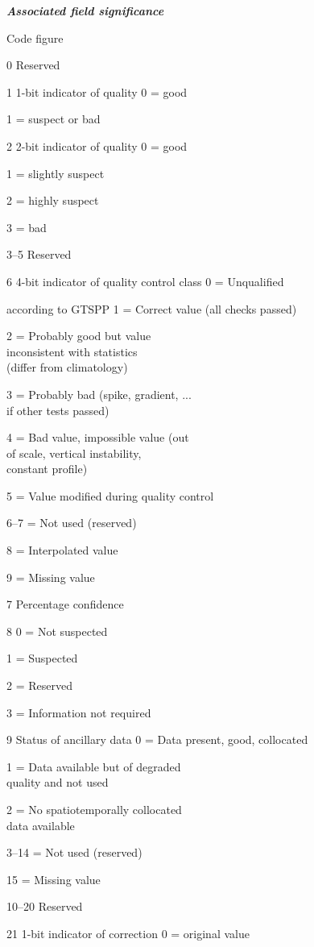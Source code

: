 \emph{\textbf{Associated field significance}}

Code figure

0 Reserved

1 1-bit indicator of quality 0 = good

1 = suspect or bad

2 2-bit indicator of quality 0 = good

1 = slightly suspect

2 = highly suspect

3 = bad

3--5 Reserved

6 4-bit indicator of quality control class 0 = Unqualified

according to GTSPP 1 = Correct value (all checks passed)

2 = Probably good but value\\
inconsistent with statistics\\
(differ from climatology)

3 = Probably bad (spike, gradient, ...\\
if other tests passed)

4 = Bad value, impossible value (out\\
of scale, vertical instability,\\
constant profile)

5 = Value modified during quality control

6--7 = Not used (reserved)

8 = Interpolated value

9 = Missing value

7 Percentage confidence

8 0 = Not suspected

1 = Suspected

2 = Reserved

3 = Information not required

9 Status of ancillary data 0 = Data present, good, collocated

1 = Data available but of degraded\\
quality and not used

2 = No spatiotemporally collocated\\
data available

3--14 = Not used (reserved)

15 = Missing value

10--20 Reserved

21 1-bit indicator of correction 0 = original value

